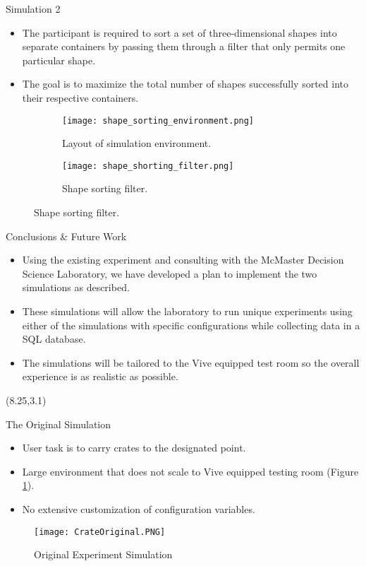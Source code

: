 \documentclass[22pt]{beamer}
\begin{document}
\begin{frame}[fragile]
\begin{textblock}{7.25}
\begin{block}{Simulation 2}
\begin{itemize}
\item The participant is required to sort a set of three-dimensional
shapes into separate containers by passing them
through a filter that only permits one particular shape.
\item The goal is to maximize the total number of shapes successfully sorted into
their respective containers.
\end{itemize}
\begin{figure}
  \begin{subfigure}[b]{0.40\textwidth}
    \texttt{[image: shape\_sorting\_environment.png]}
        \caption{Layout of simulation environment.}
  \end{subfigure}
  \begin{subfigure}[b]{0.40\textwidth}
    \texttt{[image: shape\_shorting\_filter.png]}
        \caption{Shape sorting filter.}
    \end{subfigure}
 \end{figure}
\end{block}


\begin{block}{Conclusions \& Future Work}
\begin{itemize}
\item Using the existing experiment and consulting with the McMaster Decision Science Laboratory, we have developed a plan to implement the two simulations as described.
\item These simulations will allow the laboratory to run unique experiments using either of the simulations with specific configurations while collecting data in a SQL database.
\item The simulations will be tailored to the Vive equipped test room so the overall experience is as realistic as possible.
\end{itemize}
\end{block}

\end{textblock}




\begin{textblock}{7.25}(8.25,3.1)

\begin{block}{The Original Simulation}
\begin{itemize}
\item User task is to carry crates to the designated point.
\item Large environment that does not scale to Vive equipped testing room (Figure \ref{fig:orig}).
\item No extensive customization of configuration variables.
\end{itemize}
\begin{figure}
    \texttt{[image: CrateOriginal.PNG]}
  \caption{Original Experiment Simulation}
\label{fig:orig}
\end{figure}
\end{block}


\end{textblock}
\end{frame}
\end{document}
